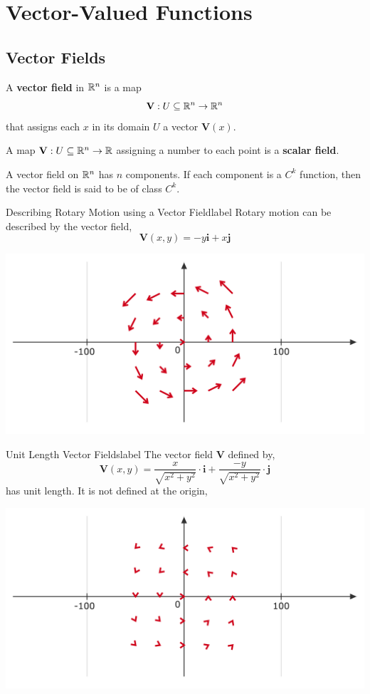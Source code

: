 \section{Vector-Valued Functions}
\subsection{Vector Fields}
\begin{defn}
	\sloppy A \textbf{vector field} in $\mathbb{R}^n$ is a map
	\[\mathbf{V}: U \subseteq \mathbb{R}^n \rightarrow \mathbb{R}^n\]
	that assigns each $x$ in its domain $U$ a vector $\mathbf{V}(x)$. 
\end{defn}

\begin{marginfigure}
	A map $\mathbf{V}: U \subseteq \mathbb{R}^n \rightarrow \mathbb{R}$ assigning a number to each point is a \textbf{scalar field}. 
\end{marginfigure}

\begin{marginfigure}
	A vector field on $\mathbb{R}^n$ has $n$ components. If each component is a $C^k$ function, then the vector field is said to be of class $C^k$.
\end{marginfigure}

\begin{ex}{Describing Rotary Motion using a Vector Field}{label}
	Rotary motion can be described by the vector field,
	\[\mathbf{V}(x, y) = -y \mathbf{i} + x \mathbf{j}\]
	\begin{center}
    \includegraphics[width=0.7\linewidth]{figures/wk-6/fig-1.png}
	\end{center}
\end{ex}

\begin{ex}{Unit Length Vector Fields}{label}
	The vector field $\mathbf{V}$ defined by,
	\[\mathbf{V}(x, y)=\frac{x}{\sqrt{x^2+y^2}} \cdot \mathbf{i}+\frac{-y}{\sqrt{x^2+y^2}}  \cdot \mathbf{j}\]
	has unit length. It is not defined at the origin,
	\begin{center}
    \includegraphics[width=0.7\linewidth]{figures/wk-6/fig-2.png}
	\end{center}
\end{ex}

